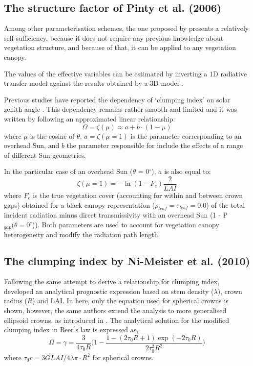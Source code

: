 \documentclass[a4paper,11pt]{report}
\begin{document}
\subsection{The structure factor of Pinty et al. (2006)}
Among other parameterisation schemes, the one proposed by \citet{pinty2006} presents a relatively self-sufficiency, because it does not require any previous knowledge about vegetation structure, and because of that, it can be applied to any vegetation canopy. 

The values of the effective variables can be estimated by inverting a 1D radiative transfer model against the results obtained by a 3D model \citep{pinty2006}.

Previous studies have reported the dependency of `clumping index' on solar zenith angle \citep{Andrieu1993,Chen1996,Kucharik1999,Leblanc2005,Ryu2010}. This dependency remains rather smooth and limited \citep{Chen1997a,Chen1997} and it was written by \citet{pinty2006} following an approximated linear relationship:
\begin{equation}
\Omega = \zeta(\mu) \approx a + b \cdot (1 - \mu)
\label{equation:structurefactor}
\end{equation}
\noindent where $\mu$ is the cosine of $\theta$, $a = \zeta(\mu=1)$ is the parameter corresponding to an overhead Sun, and $b$ the parameter responsible for include the effects of a range of different Sun geometries.

In the particular case of an overhead Sun ($\theta$ = 0$^{\circ}$), $a$ is also equal to:
 \begin{equation}
\zeta(\mu=1) = -\ln{(1 - F_c)}\frac{2}{LAI}
\label{equation:structurefactora}
\end{equation}
\noindent where $F_c$ is the true vegetation cover (accounting for within and between crown gaps) obtained for a black canopy representation ($\rho_{leaf} = \tau_{leaf} = 0.0$) of the total incident radiation minus direct transmissivity with an overhead Sun (1 - P$_{gap}(\theta = 0^{\circ}$)).
Both parameters are used to account for vegetation canopy heterogeneity and modify the radiation path length. 

\subsection{The clumping index by Ni-Meister et al. (2010)}
Following the same attempt to derive a relationship for clumping index, \citet{Ni-Meister2010} developed an analytical prognostic expression based on stem density ($\lambda$), crown radius ($R$) and LAI. In here, only the equation used for spherical crowns is shown, however, the same authors extend the analysis to more generalised ellipsoid crowns, as introduced in \citet{Li1988}. The analytical solution for the modified clumping index in Beer$^{\prime}$s law is expressed as, 
\begin{equation}
\Omega = \gamma = \frac{3}{4\tau_0R}\Big(1 - \frac{1 - (2\tau_0R + 1)\exp(-2\tau_0R)}{2\tau_0^2R^2}\Big)
\label{equation:clumpNi}
\end{equation}
\noindent where $\tau_0r = 3 G LAI/ 4 \lambda \pi \cdot R^2$ for spherical crowns. 
\end{document}
